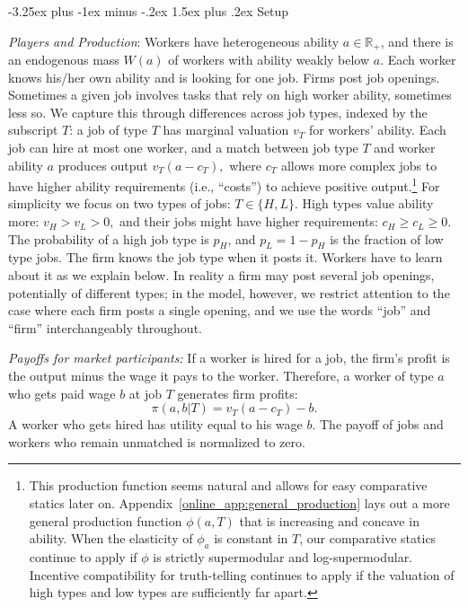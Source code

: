 \documentclass[12pt]{article}
\makeatletter
\renewcommand{\subsection}{%
  \@startsection{subsection}{2}{\z@}%
  {-3.25ex plus -1ex minus -.2ex}%
  {1.5ex plus .2ex}%
  {\normalfont\large\bfseries}%
}
\makeatother
\begin{document}
\subsection{Setup}\label{sec:setup}

\textit{Players and Production}: Workers have heterogeneous ability $a \in \mathbb{R}_{+}$, and there is an endogenous mass $W(a)$ of workers with ability weakly below $a$. Each worker knows his/her own ability and is looking for one job. Firms post job openings. Sometimes a given job involves tasks that rely on high worker ability, sometimes less so. We capture this through differences across job types, indexed by the subscript $T$: a job of type $T$ has marginal valuation $v_{T}$ for workers' ability. Each job can hire at most one worker, and a match between job type $T$ and worker ability $a$ produces output $v_{T}(a-c_{T}),$ where $c_{T}$ allows more complex jobs to have higher ability requirements (i.e., ``costs'') to achieve positive output.\footnote{This production function seems natural and allows for easy comparative statics later on. Appendix~\ref{online_app:general_production} lays out a more general production function $\phi(a,T)$ that is increasing and concave in ability. When the elasticity of $\phi_a$ is constant in $T$, our comparative statics continue to apply if $\phi$ is strictly supermodular and log-supermodular. Incentive compatibility for truth-telling continues to apply if the valuation of high types and low types are sufficiently far apart.}
For simplicity we focus on two types of jobs: $T\in \{H,L\}.$ High types value
ability more: $v_{H}>v_{L}>0,$ and their jobs might have higher requirements: $%
c_{H}\geq c_{L}\geq 0$. The probability of a high job type is $p_{H}$, and $p_{L} = 1-p_{H}$ is the fraction of low type jobs. The firm knows the job type when it posts it. Workers have to learn about it as we explain below. In reality a firm may post several job openings, potentially of different types; in the model, however, we restrict attention to the case where each firm posts a single opening, and we use the words ``job'' and ``firm'' interchangeably throughout.

\textit{Payoffs for market participants:} If a worker is hired for a job, the firm's profit is the output
minus the wage it pays to the worker. Therefore, a worker of type $a$ who
gets paid wage $b$ at job $T$ generates firm profits:%
\begin{equation}
\pi (a,b|T)=v_{T}(a-c_{T})-b.  \label{firm-profit}
\end{equation}%
A worker who gets hired has utility equal to his wage $b$. The payoff of jobs
and workers who remain unmatched is normalized to zero.
\end{document}
